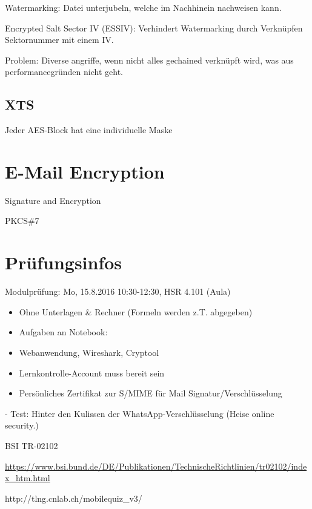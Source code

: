 Watermarking: Datei unterjubeln, welche im Nachhinein nachweisen kann.


Encrypted Salt Sector IV (ESSIV): Verhindert Watermarking durch Verknüpfen Sektornummer mit einem IV.


Problem: Diverse angriffe, wenn nicht alles gechained verknüpft wird, was aus performancegründen nicht geht.

\subsection{XTS}

Jeder AES-Block hat eine individuelle Maske 

\section{E-Mail Encryption}

Signature and Encryption

PKCS\#7


\section{Prüfungsinfos}

Modulprüfung: Mo, 15.8.2016
10:30-12:30, HSR 4.101 (Aula)

\begin{itemize}
\item Ohne Unterlagen \& Rechner (Formeln werden z.T. abgegeben)
\item Aufgaben an Notebook:
\item Webanwendung, Wireshark, Cryptool
\item Lernkontrolle-Account muss bereit sein
\item Persönliches Zertifikat zur S/MIME für Mail Signatur/Verschlüsselung
\end{itemize}

- Test: Hinter den Kulissen der WhatsApp-Verschlüsselung (Heise online security.)

BSI TR-02102

\url{https://www.bsi.bund.de/DE/Publikationen/TechnischeRichtlinien/tr02102/index_htm.html}

http://tlng.cnlab.ch/mobilequiz_v3/
